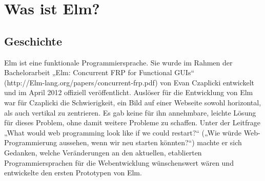 \section{Was ist Elm?}
\label{sec:Was ist Elm?}

\subsection{Geschichte}
\label{sec:Geschichte}
Elm ist eine funktionale Programmiersprache. Sie wurde im Rahmen der Bachelorarbeit „Elm: Concurrent FRP for Functional GUIs“\\
 (http://Elm-lang.org/papers/concurrent-frp.pdf)
von Evan Czaplicki entwickelt und im April 2012 offiziell veröffentlicht.
Auslöser für die Entwicklung von Elm war für Czaplicki die Schwierigkeit, ein Bild auf einer Webseite sowohl horizontal, als auch vertikal zu zentrieren. Es gab keine für ihn annehmbare, leichte Lösung für dieses Problem, ohne damit weitere Probleme zu schaffen. Unter der Leitfrage „What would web programming look like if we could restart?“ („Wie würde Web-Programmierung aussehen, wenn wir neu starten könnten?“) machte er sich Gedanken, welche Veränderungen an den aktuellen, etablierten Programmiersprachen für die Webentwicklung wünschenswert wären und entwickelte den ersten Prototypen von Elm.
